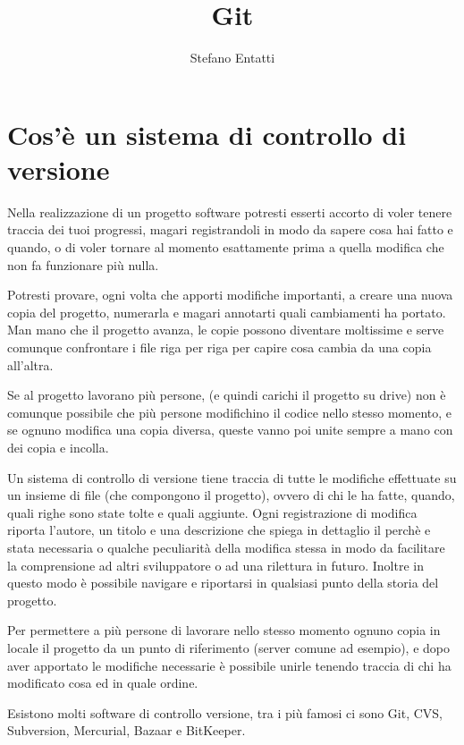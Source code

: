 \documentclass{article} \usepackage[textwidth=18cm,textheight=18cm]{geometry}
\title{Git} \date{\vspace{-5ex}} \author{Stefano Entatti}
\begin{document}
\maketitle

\newcommand{\code}[1]{\texttt{#1}}

\section{Cos'è un sistema di controllo di versione}

Nella realizzazione di un progetto software potresti esserti accorto di voler
tenere traccia dei tuoi progressi, magari registrandoli in modo da sapere cosa
hai fatto e quando, o di voler tornare al momento esattamente prima a quella
modifica che non fa funzionare più nulla. 

Potresti provare, ogni volta che apporti modifiche importanti, a creare una
nuova copia del progetto, numerarla e magari annotarti quali cambiamenti ha
portato. Man mano che il progetto avanza, le copie possono diventare moltissime
e serve comunque confrontare i file riga per riga per capire cosa cambia da una
copia all'altra.

Se al progetto lavorano più persone, (e quindi carichi il progetto su drive) non
è comunque possibile che più persone modifichino il codice nello stesso momento,
e se ognuno modifica una copia diversa, queste vanno poi unite sempre a mano con
dei copia e incolla.

Un sistema di controllo di versione tiene traccia di tutte le modifiche
effettuate su un insieme di file (che compongono il progetto), ovvero di chi le
ha fatte, quando, quali righe sono state tolte e quali aggiunte. Ogni registrazione
di modifica riporta l'autore, un titolo e una descrizione che spiega in dettaglio
il perchè e stata necessaria o qualche peculiarità della modifica stessa
in modo da facilitare la comprensione ad altri sviluppatore o ad una rilettura
in futuro. Inoltre in questo modo è possibile navigare e riportarsi in 
qualsiasi punto della storia del progetto.

Per permettere a più persone di lavorare nello stesso momento ognuno
copia in locale il progetto da un punto di riferimento (server comune ad
esempio), e dopo aver apportato le modifiche necessarie è possibile unirle 
tenendo traccia di chi ha modificato cosa ed in quale ordine.

Esistono molti software di controllo versione, tra i più famosi ci sono Git,
CVS, Subversion, Mercurial, Bazaar e BitKeeper.
\end{document}

